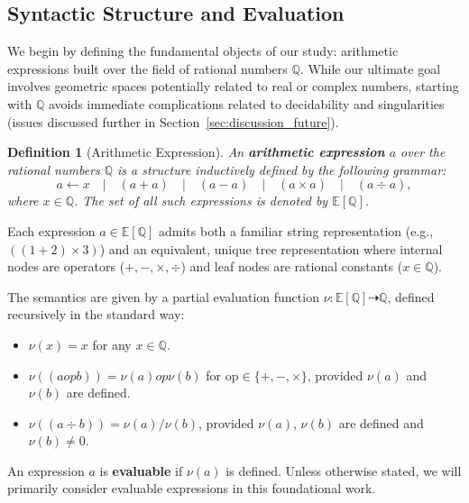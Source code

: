 \documentclass[12pt]{article}
\newtheorem{definition}{Definition}[section]
\begin{document}
\subsection{Syntactic Structure and Evaluation}

We begin by defining the fundamental objects of our study: arithmetic expressions built over the field of rational numbers \( \mathbb{Q} \). While our ultimate goal involves geometric spaces potentially related to real or complex numbers, starting with \( \mathbb{Q} \) avoids immediate complications related to decidability and singularities (issues discussed further in Section~\ref{sec:discussion_future}).

\begin{definition}[Arithmetic Expression]\label{def:arithmetic_expression_cs}
An \textbf{arithmetic expression} \( a \) over the rational numbers \( \mathbb{Q} \) is a structure inductively defined by the following grammar:
\begin{equation*}
a \longleftarrow x \quad | \quad (a + a) \quad | \quad (a - a) \quad | \quad (a \times a) \quad | \quad (a \div a),
\end{equation*}
where \( x \in \mathbb{Q} \). The set of all such expressions is denoted by \( \mathbb{E}[\mathbb{Q}] \).
\end{definition}

Each expression \( a \in \mathbb{E}[\mathbb{Q}] \) admits both a familiar string representation (e.g., \( ((1+2)\times 3) \)) and an equivalent, unique tree representation where internal nodes are operators (\(+, -, \times, \div\)) and leaf nodes are rational constants (\(x \in \mathbb{Q}\)).

The semantics are given by a partial evaluation function \( \nu: \mathbb{E}[\mathbb{Q}] \dashrightarrow \mathbb{Q} \), defined recursively in the standard way:
\begin{itemize}
    \item \( \nu(x) = x \) for any \( x \in \mathbb{Q} \).
    \item \( \nu((a \mathbin{op} b)) = \nu(a) \mathbin{op} \nu(b) \) for \( \mathrm{op} \in \{+, -, \times\} \), provided \( \nu(a) \) and \( \nu(b) \) are defined.
    \item \( \nu((a \div b)) = \nu(a) / \nu(b) \), provided \( \nu(a) \), \( \nu(b) \) are defined and \( \nu(b) \neq 0 \).
\end{itemize}
An expression \( a \) is \textbf{evaluable} if \( \nu(a) \) is defined. Unless otherwise stated, we will primarily consider evaluable expressions in this foundational work.
\end{document}
